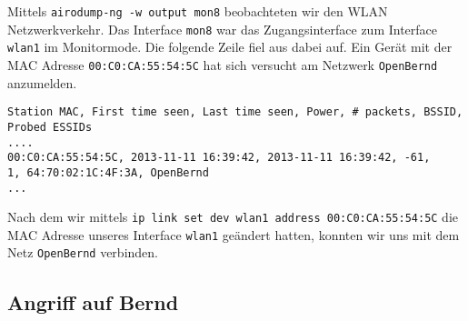 \documentclass[10pt,a4paper]{article}
\begin{document}
Mittels \texttt{airodump-ng -w output mon8} beobachteten wir den WLAN Netzwerkverkehr. Das Interface \texttt{mon8} war das Zugangsinterface zum Interface \texttt{wlan1} im Monitormode. Die folgende Zeile fiel aus dabei auf. Ein Gerät mit der MAC Adresse \texttt{00:C0:CA:55:54:5C} hat sich versucht am Netzwerk \texttt{OpenBernd} anzumelden.
\begin{small}
\begin{verbatim}
Station MAC, First time seen, Last time seen, Power, # packets, BSSID, Probed ESSIDs
....
00:C0:CA:55:54:5C, 2013-11-11 16:39:42, 2013-11-11 16:39:42, -61,        1, 64:70:02:1C:4F:3A, OpenBernd
...
\end{verbatim}
\end{small}
Nach dem wir mittels \texttt{ip link set dev wlan1 address 00:C0:CA:55:54:5C} die MAC Adresse unseres Interface \texttt{wlan1} geändert hatten, konnten wir uns mit dem Netz \texttt{OpenBernd} verbinden.

\subsection{Angriff auf Bernd}
\end{document}
